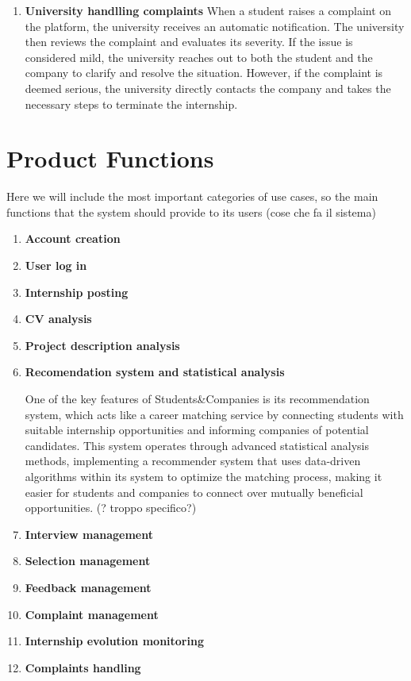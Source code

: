 \begin{enumerate}
\item \textbf{University handlling complaints}
When a student raises a complaint on the platform, the university receives an automatic notification. The university then reviews the complaint and evaluates its severity. If the issue is considered mild, the university reaches out to both the student and the company to clarify and resolve the situation. However, if the complaint is deemed serious, the university directly contacts the company and takes the necessary steps to terminate the internship.

\end{enumerate}
\section{Product Functions}

Here we will include the most important categories of use cases, so the main functions that the system should provide to its users (cose che fa il sistema)

\begin{enumerate}

\item \textbf{Account creation}

\item \textbf{User log in}

\item \textbf{Internship posting}

\item \textbf{CV analysis}

\item \textbf{Project description analysis}

\item \textbf{Recomendation system and statistical analysis}

One of the key features of Students\&Companies is its recommendation system, which acts like a career matching service by connecting students with suitable internship opportunities and informing companies of potential candidates. This system operates through advanced statistical analysis methods, implementing a recommender system that uses data-driven algorithms within its system to optimize the matching process, making it easier for students and companies to connect over mutually beneficial opportunities. (? troppo specifico?)

\item \textbf{Interview management}

\item \textbf{Selection management}

\item \textbf{Feedback management}

\item \textbf{Complaint management}

\item \textbf{Internship evolution monitoring}

\item \textbf{Complaints handling}

\end{enumerate}

